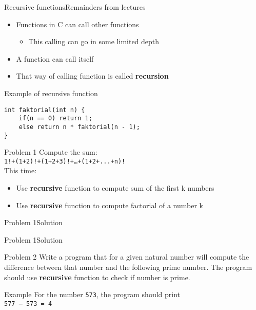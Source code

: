 


\begin{frame}[fragile]{Recursive functions}{Remainders from lectures}
\begin{itemize}
    \item Functions in C can call other functions
    \begin{itemize}
        \item This calling can go in some limited depth
    \end{itemize}    
    \item A function can call itself
    \item That way of calling function is called \textbf{recursion}    
\end{itemize}
\begin{exampleblock}{Example of recursive function}
\begin{lstlisting}
int faktorial(int n) {
    if(n == 0) return 1;
    else return n * faktorial(n - 1);
}
\end{lstlisting}
\end{exampleblock}
\end{frame}

\begin{frame}{Problem 1}
Compute the sum:\\
\texttt{1!+(1+2)!+(1+2+3)!+\ldots+(1+2+...+n)!}
\\This time:\\
\begin{itemize}
    \item Use \textbf{recursive} function to compute sum of the first
    k numbers
    \item Use \textbf{recursive} function to compute factorial of a number k
\end{itemize}
\end{frame}

\begin{frame}[fragile]{Problem 1}{Solution}

\end{frame}

\begin{frame}[fragile]{Problem 1}{Solution}

\end{frame}


\begin{frame}{Problem 2}
Write a program that for a given natural number will compute the difference
between that number and the following prime number. The program should use
\textbf{recursive} function to check if number is prime.
\begin{exampleblock}{Example}
For the number \texttt{573}, the program should print\\
\texttt{577 – 573 = 4}
\end{exampleblock}
\end{frame}

